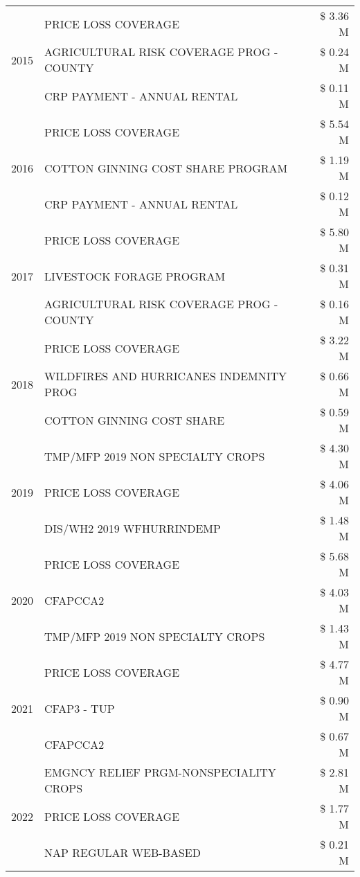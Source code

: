 \begin{tabular}{llr}
\cline{1-3}
\multirow[t]{3}{*}{2015} & PRICE LOSS COVERAGE & \$ 3.36 M \\
 & AGRICULTURAL RISK COVERAGE PROG - COUNTY & \$ 0.24 M \\
 & CRP PAYMENT - ANNUAL RENTAL & \$ 0.11 M \\
\cline{1-3}
\multirow[t]{3}{*}{2016} & PRICE LOSS COVERAGE & \$ 5.54 M \\
 & COTTON GINNING COST SHARE PROGRAM & \$ 1.19 M \\
 & CRP PAYMENT - ANNUAL RENTAL & \$ 0.12 M \\
\cline{1-3}
\multirow[t]{3}{*}{2017} & PRICE LOSS COVERAGE & \$ 5.80 M \\
 & LIVESTOCK FORAGE PROGRAM & \$ 0.31 M \\
 & AGRICULTURAL RISK COVERAGE PROG - COUNTY & \$ 0.16 M \\
\cline{1-3}
\multirow[t]{3}{*}{2018} & PRICE LOSS COVERAGE & \$ 3.22 M \\
 & WILDFIRES AND HURRICANES INDEMNITY PROG & \$ 0.66 M \\
 & COTTON GINNING COST SHARE & \$ 0.59 M \\
\cline{1-3}
\multirow[t]{3}{*}{2019} & TMP/MFP 2019 NON SPECIALTY CROPS & \$ 4.30 M \\
 & PRICE LOSS COVERAGE & \$ 4.06 M \\
 & DIS/WH2 2019 WFHURRINDEMP & \$ 1.48 M \\
\cline{1-3}
\multirow[t]{3}{*}{2020} & PRICE LOSS COVERAGE & \$ 5.68 M \\
 & CFAPCCA2 & \$ 4.03 M \\
 & TMP/MFP 2019 NON SPECIALTY CROPS & \$ 1.43 M \\
\cline{1-3}
\multirow[t]{3}{*}{2021} & PRICE LOSS COVERAGE & \$ 4.77 M \\
 & CFAP3 - TUP & \$ 0.90 M \\
 & CFAPCCA2 & \$ 0.67 M \\
\cline{1-3}
\multirow[t]{3}{*}{2022} & EMGNCY RELIEF PRGM-NONSPECIALITY CROPS & \$ 2.81 M \\
 & PRICE LOSS COVERAGE & \$ 1.77 M \\
 & NAP REGULAR WEB-BASED & \$ 0.21 M \\
\cline{1-3}
\bottomrule
\end{tabular}
